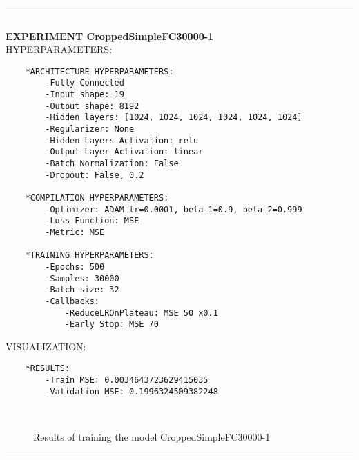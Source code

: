 \rule{0.5\textwidth}{0.5pt}\\

	{\large \textbf{EXPERIMENT CroppedSimpleFC30000-1}}\\
	
	{\normalsize HYPERPARAMETERS:}
	\begin{lstlisting}	
	*ARCHITECTURE HYPERPARAMETERS:
		-Fully Connected
		-Input shape: 19
		-Output shape: 8192
		-Hidden layers: [1024, 1024, 1024, 1024, 1024, 1024]
		-Regularizer: None
		-Hidden Layers Activation: relu
		-Output Layer Activation: linear
		-Batch Normalization: False
		-Dropout: False, 0.2
	
	*COMPILATION HYPERPARAMETERS:
		-Optimizer: ADAM lr=0.0001, beta_1=0.9, beta_2=0.999
		-Loss Function: MSE
		-Metric: MSE
	
	*TRAINING HYPERPARAMETERS:
		-Epochs: 500
		-Samples: 30000
		-Batch size: 32
		-Callbacks: 
			-ReduceLROnPlateau: MSE 50 x0.1
			-Early Stop: MSE 70
	\end{lstlisting}
	
	{\normalsize VISUALIZATION:}
	\begin{lstlisting}
	*RESULTS:
        -Train MSE: 0.0034643723629415035
        -Validation MSE: 0.1996324509382248
	\end{lstlisting}
	
	\begin{figure*}[ht!]
		\hspace{\fill}
		\hspace{\fill}
		\\
		\caption{Results of training the model CroppedSimpleFC30000-1}
	\end{figure*}
	
\FloatBarrier	
\rule{0.5\textwidth}{0.5pt}\\